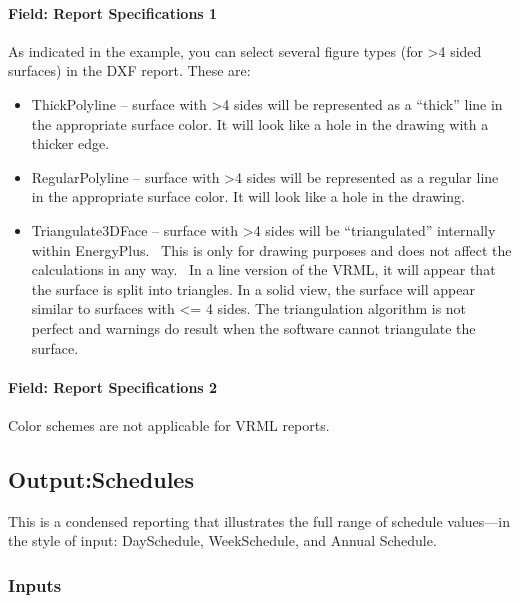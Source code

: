 \paragraph{Field: Report Specifications 1}\label{field-report-specifications-1-1}

As indicated in the example, you can select several figure types (for \textgreater{}4 sided surfaces) in the DXF report. These are:

\begin{itemize}
\item
  ThickPolyline -- surface with \textgreater{}4 sides will be represented as a ``thick'' line in the appropriate surface color. It will look like a hole in the drawing with a thicker edge.
\item
  RegularPolyline -- surface with \textgreater{}4 sides will be represented as a regular line in the appropriate surface color. It will look like a hole in the drawing.
\item
  Triangulate3DFace -- surface with \textgreater{}4 sides will be ``triangulated'' internally within EnergyPlus.~ This is only for drawing purposes and does not affect the calculations in any way.~ In a line version of the VRML, it will appear that the surface is split into triangles. In a solid view, the surface will appear similar to surfaces with \textless{}= 4 sides. The triangulation algorithm is not perfect and warnings do result when the software cannot triangulate the surface.
\end{itemize}

\paragraph{Field: Report Specifications 2}\label{field-report-specifications-2-1}

Color schemes are not applicable for VRML reports.

\subsection{Output:Schedules}\label{outputschedules}

This is a condensed reporting that illustrates the full range of schedule values---in the style of input: DaySchedule, WeekSchedule, and Annual Schedule.

\subsubsection{Inputs}\label{inputs-2-034}

